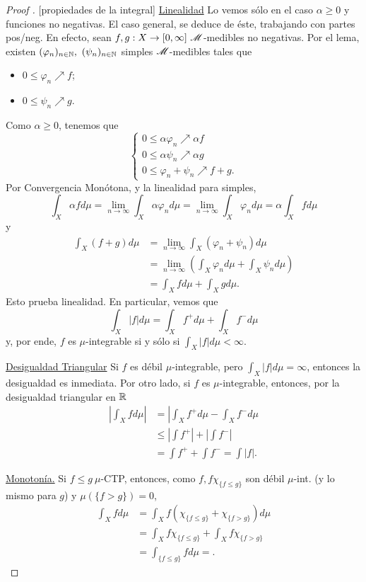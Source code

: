 \begin{proof}[Proof ][propiedades de la integral]
	\underline{Linealidad} Lo vemos sólo en el caso $\alpha \geq 0$ y funciones no negativas. El caso general, se deduce de éste, trabajando con partes pos/neg. En efecto, sean $f,g : X \to [0,\infty] \ \mathscr{M}$-medibles no negativas. Por el lema, existen $(\varphi_{n})_{n\in\N},\ (\psi_{n})_{n\in\N}$ simples $\mathscr{M}$-medibles tales que
	\begin{itemize}
		\item $0 \leq \varphi_{n} \nearrow f$;

		\item $0 \leq \psi_{n} \nearrow g$.
	\end{itemize}
	Como $\alpha \geq 0$, tenemos que
	\[ \begin{cases}
			0 \leq \alpha \varphi_{n} \nearrow \alpha f \\
			0 \leq \alpha \psi_{n} \nearrow \alpha g \\
			0 \leq \varphi_{n} + \psi_{n} \nearrow f + g.
		\end{cases} \]
	Por Convergencia Monótona, y la linealidad para simples,
	\[ \int_{X} \alpha f d\mu = \lim_{n \to \infty} \int_{X} \alpha \varphi_{n}d\mu = \lim_{n \to \infty} \int_{X} \varphi_{n} d\mu = \alpha \int_{X} f d\mu \]
	y
	\begin{align*}
		\int_{X} (f + g) d\mu &= \lim_{n \to \infty} \int_{X} (\varphi_{n} + \psi_{n}) d\mu \\
		&= \lim_{n \to \infty} \left( \int_{X} \varphi_{n} d\mu + \int_{X} \psi_{n} d\mu \right) \\
		&= \int_{X} f d\mu + \int_{X} g d\mu. 
	\end{align*}
	Esto prueba linealidad. En particular, vemos que
	\[ \int_{X} |f| d\mu = \int_{X} f^{+} d\mu + \int_{X} f^{-} d\mu \]
	y, por ende, $f$ es $\mu$-integrable si y sólo si $\int_{X} |f| d\mu < \infty$. \par
	\medskip
	\underline{Desigualdad Triangular} Si $f$ es débil $\mu$-integrable, pero $\int_{X}|f| d\mu = \infty$, entonces la desigualdad es inmediata. Por otro lado, si $f$ es $\mu$-integrable, entonces, por la desigualdad triangular en $\mathbb{R}$
	\begin{align*}
		\left| \int_{X} f d\mu \right| &= \left| \int_{X} f^{+} d\mu - \int_{X} f^{-} d\mu \\
		&\leq \left| \int f^{+} \right| + \left| \int f^{-} \right| \\
		&= \int f^{+} + \int f^{-} = \int |f|
	.\end{align*}
	\par
	\underline{Monotonía.} Si $f \leq g \ \mu$-CTP, entonces, como $f, f \chi_{\{f \leq g\}}$ son débil $\mu$-int. (y lo mismo para $g$) y $\mu(\{f > g\} ) = 0$,
	\begin{align*}
		\int_{X} f d\mu &= \int_{X} f( \chi_{\{f \leq g\}} + \chi_{\{f > g\} }) d\mu \\
		&= \int_{X} f \chi_{\{f \leq g\}  } + \int_{X} f \chi_{\{f > g\}  } \\
		&= \int_{\{f \leq g\}  } f d\mu = 
	.\end{align*}
\end{proof}
